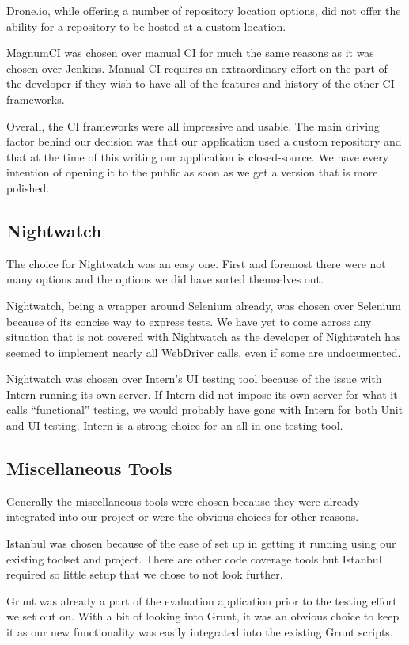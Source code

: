 \documentclass[12pt]{ucthesis}
\begin{document}
Drone.io, while offering a number of repository location options, did not offer the ability for a repository to be hosted at a custom location.

MagnumCI was chosen over manual CI for much the same reasons as it was chosen over Jenkins. Manual CI requires an extraordinary effort on the part of the developer if they wish to have all of the features and history of the other CI frameworks.

Overall, the CI frameworks were all impressive and usable. The main driving factor behind our decision was that our application used a custom repository and that at the time of this writing our application is closed-source. We have every intention of opening it to the public as soon as we get a version that is more polished.

\subsection{Nightwatch}
The choice for Nightwatch was an easy one. First and foremost there were not many options and the options we did have sorted themselves out.

Nightwatch, being a wrapper around Selenium already, was chosen over Selenium because of its concise way to express tests. We have yet to come across any situation that is not covered with Nightwatch as the developer of Nightwatch has seemed to implement nearly all WebDriver calls, even if some are undocumented.

Nightwatch was chosen over Intern's UI testing tool because of the issue with Intern running its own server. If Intern did not impose its own server for what it calls ``functional'' testing, we would probably have gone with Intern for both Unit and UI testing. Intern is a strong choice for an all-in-one testing tool.

\subsection{Miscellaneous Tools}
Generally the miscellaneous tools were chosen because they were already integrated into our project or were the obvious choices for other reasons.

Istanbul was chosen because of the ease of set up in getting it running using our existing toolset and project. There are other code coverage tools but Istanbul required so little setup that we chose to not look further.

Grunt was already a part of the evaluation application prior to the testing effort we set out on. With a bit of looking into Grunt, it was an obvious choice to keep it as our new functionality was easily integrated into the existing Grunt scripts.
\end{document}
